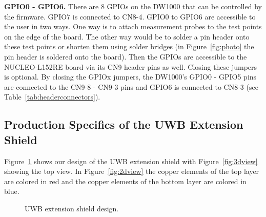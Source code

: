 \documentclass[journal,comsoc]{IEEEtran}
\begin{document}
\vspace*{0.5em}
\noindent\textbf{GPIO0 - GPIO6.} There are 8 GPIOs on the DW1000 that can be controlled by the firmware. 
GPIO7 is connected to CN8-4.
GPIO0 to GPIO6 are accessible to the user in two ways. 
One way is to attach measurement probes to the test points on the edge of the board. 
The other way would be to solder a pin header onto these test points or shorten them using solder bridges (in Figure~\ref{fig:photo} the pin header is soldered onto the board). 
Then the GPIOs are accessible to the NUCLEO-L152RE board via its CN9 header pins as well. 
Closing these jumpers is optional. 
By closing the GPIOx jumpers, the DW1000's GPIO0 - GPIO5 pins are connected to the CN9-8 - CN9-3 pins and GPIO6 is connected to CN8-3 (see Table~\ref{tab:headerconnectors}).


\subsection{Production Specifics of the UWB Extension Shield}
\label{subsec:hwdesignuwbshield}
Figure~\ref{fig:altiumscreenshots} shows our design of the UWB extension shield with Figure~\ref{fig:3dview} showing the top view.
In Figure~\ref{fig:2dview} the copper elements of the top layer are colored in red and the copper elements of the bottom layer are colored in blue. 
\begin{figure}[t!]
	\centering
	\hfil
	\caption{UWB extension shield design.}
	\label{fig:altiumscreenshots}
\end{figure}
\end{document}
